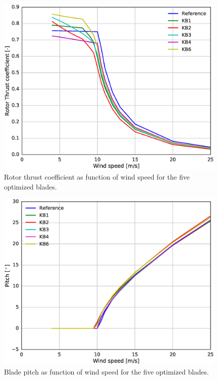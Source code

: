\begin{figure}[!ht]
\begin{center}
	\includegraphics[width=.85\linewidth]{figures/KBcomp_CT.eps}
\end{center}
\caption{Rotor thrust coefficient as function of wind speed for the five optimized blades.}
\label{fig:ct}
\end{figure}

\begin{figure}[!ht]
\begin{center}
	\includegraphics[width=.85\linewidth]{figures/KBcomp_pitch.eps}
\end{center}
\caption{Blade pitch as function of wind speed for the five optimized blades.}
\label{fig:pitch}
\end{figure}

